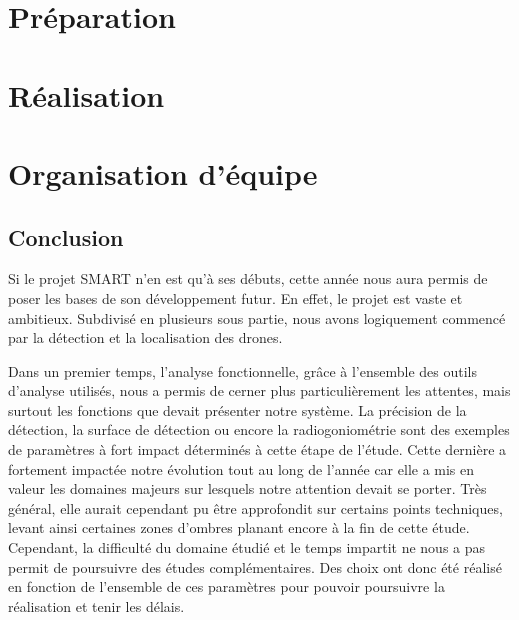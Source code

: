 \documentclass[a4paper, 11pt, oneside, oldfontcommands]{memoir}
\newcounter{rem}[chapter]
\begin{document}
% 
% 
% 
% 
% 

%
%


\part{Préparation}





\part{Réalisation}






\part{Organisation d'équipe}






\chapter*{Conclusion}
Si le projet SMART n'en est qu'à ses débuts, cette année nous aura permis de poser les bases de son développement futur. En effet, le projet est vaste et ambitieux. Subdivisé en plusieurs sous partie, nous avons logiquement commencé par la détection et la localisation des drones.

Dans un premier temps, l'analyse fonctionnelle, grâce à l'ensemble des outils d'analyse utilisés, nous a permis de cerner plus particulièrement les attentes, mais surtout les fonctions que devait présenter notre système. La précision de la détection, la surface de détection ou encore la radiogoniométrie sont des exemples de paramètres à fort impact déterminés à cette étape de l'étude. Cette dernière a fortement impactée notre évolution tout au long de l'année car elle a mis en valeur les domaines majeurs sur lesquels notre attention devait se porter. Très général, elle aurait cependant pu être approfondit sur certains points techniques, levant ainsi certaines zones d'ombres planant encore à la fin de cette étude. Cependant, la difficulté du domaine étudié et le temps impartit ne nous a pas permit de poursuivre des études complémentaires. Des choix ont donc été réalisé en fonction de l'ensemble de ces paramètres pour pouvoir poursuivre la réalisation et tenir les délais.
\end{document}
